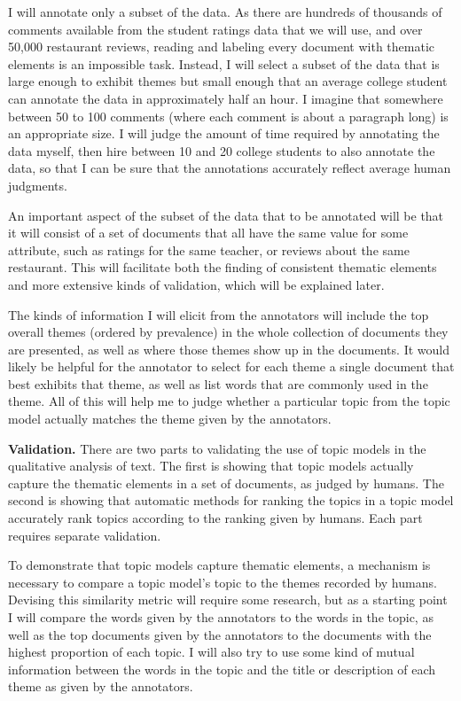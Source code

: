 \documentclass[onecolumn, 12pt]{article}
\begin{document}
I will annotate only a subset of the data.  As there are hundreds of thousands
of comments available from the student ratings data that we will use, and over
50,000 restaurant reviews, reading and labeling every document with thematic
elements is an impossible task.  Instead, I will select a subset of the data
that is large enough to exhibit themes but small enough that an average college
student can annotate the data in approximately half an hour.  I imagine that
somewhere between 50 to 100 comments (where each comment is about a paragraph
long) is an appropriate size.  I will judge the amount of time required by
annotating the data myself, then hire between 10 and 20 college students to
also annotate the data, so that I can be sure that the annotations accurately
reflect average human judgments.  

An important aspect of the subset of the data that to be annotated will be that
it will consist of a set of documents that all have the same value for some
attribute, such as ratings for the same teacher, or reviews about the same
restaurant.  This will facilitate both the finding of consistent thematic
elements and more extensive kinds of validation, which will be explained later.

The kinds of information I will elicit from the annotators will include the
top overall themes (ordered by prevalence) in the whole collection of documents
they are presented, as well as where those themes show up in the documents.  It
would likely be helpful for the annotator to select for each theme a single
document that best exhibits that theme, as well as list words that are commonly
used in the theme.  All of this will help me to judge whether a particular
topic from the topic model actually matches the theme given by the annotators.

\textbf{Validation.}  There are two parts to validating the use of topic models
in the qualitative analysis of text.  The first is showing that topic models
actually capture the thematic elements in a set of documents, as judged by
humans.  The second is showing that automatic methods for ranking the topics in
a topic model accurately rank topics according to the ranking given by humans.
Each part requires separate validation.

To demonstrate that topic models capture thematic elements, a mechanism is
necessary to compare a topic model's topic to the themes recorded by humans.
Devising this similarity metric will require some research, but as a starting
point I will compare the words given by the annotators to the words in the
topic, as well as the top documents given by the annotators to the documents
with the highest proportion of each topic.  I will also try to use some kind
of mutual information between the words in the topic and the title or
description of each theme as given by the annotators.
\end{document}
